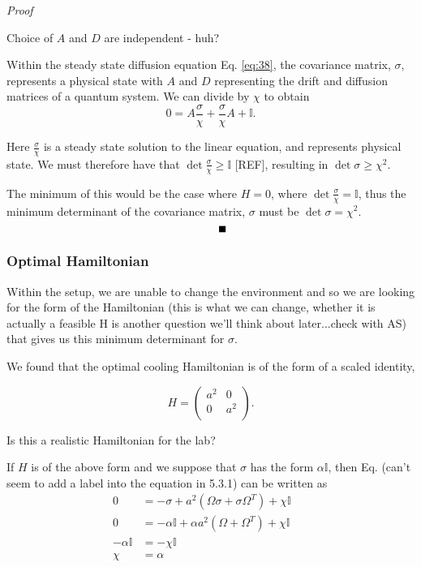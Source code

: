 \documentclass[11pt,a4paper]{article}
\numberwithin{equation}{section}
\begin{document}
	
	
	
	
	
	
	\color{blue}\emph{Proof}
	
	Choice of $A$ and $D$ are independent - huh? 
	
	Within the steady state diffusion equation Eq. \ref{eq:38}, the covariance matrix, $\sigma$, represents a physical state with $A$ and $D$ representing the drift and diffusion matrices of a quantum system. We can divide by $\chi$ to obtain
	\begin{equation*}
	0 = A \frac{\sigma}{\chi} + \frac{\sigma}{\chi} A + \mathbb{I}.
	\end{equation*}
	
	Here $\frac{\sigma}{\chi}$ is a steady state solution to the linear equation, and represents physical state. We must therefore have that $\det\frac{\sigma}{\chi} \geq \mathbb{I}$ [REF], resulting in $\det \sigma \geq \chi^2$. 
	
	The minimum of this would be the case where $H=0$, where $\det\frac{\sigma}{\chi} = \mathbb{I}$, thus the minimum determinant of the covariance matrix, $\sigma$ must be $\det \sigma = \chi^2$.
	\begin{equation*}
	\tag*{\rule{2mm}{2mm}}
	\end{equation*}\color{black}
	
	\subsubsection{Optimal Hamiltonian}
	Within the setup, we are unable to change the environment and so we are looking for the form of the Hamiltonian \color{blue}(this is what we can change, whether it is actually a feasible H is another question we'll think about later...check with AS) \color{black} that gives us this minimum determinant for $\sigma$.
	
	We found that the optimal cooling Hamiltonian is of the form of a scaled identity,
	
	\begin{equation*}
	H =  \begin{pmatrix}
	a^2 & 0  \\
	0 & a^2\\
	\end{pmatrix}.
	\end{equation*}

	\color{blue}Is this a realistic Hamiltonian for the lab?\color{black}
	
	If $H$ is of the above form and we suppose that $\sigma$ has the form $\alpha \mathbb{I}$, then Eq. (can't seem to add a label into the equation in 5.3.1) can be written as
	\begin{align*}
	0 &= -\sigma + a^2 (\Omega \sigma + \sigma \Omega^{T}) + \chi \mathbb{I}&\\
	0 &= -\alpha \mathbb{I} + \alpha a^2 (\Omega + \Omega^T) + \chi \mathbb{I}&\\
	-\alpha \mathbb{I} & = -\chi \mathbb{I} & \tag*{as $\Omega$ is anti-symmetric}&\\
	\chi &= \alpha&
	\end{align*}
	
\end{document}
